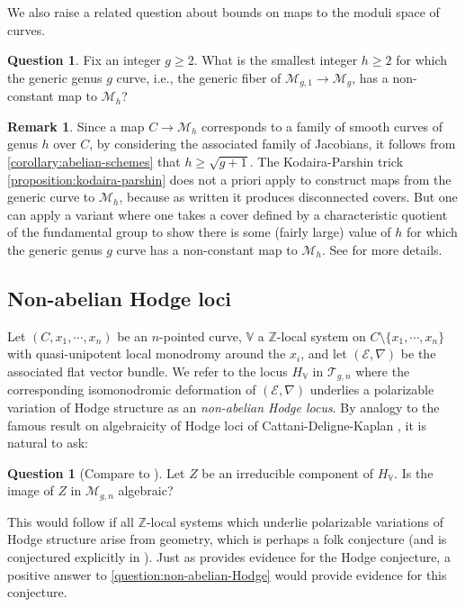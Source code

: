 \documentclass[12 pt]{amsart}
\theoremstyle{plain}
\theoremstyle{definition}
\newtheorem{remark}[subsubsection]{Remark}
\newtheorem{question}[subsubsection]{Question}
\theoremstyle{remark}
\numberwithin{equation}{section}
\begin{document}
We also raise a related question about bounds on maps to the moduli space of
curves.
\begin{question}
	\label{question:}
	Fix an integer $g\geq 2$.
	What is the smallest integer $h \geq 2$ for which the generic genus $g$ curve,
	i.e., the generic fiber of 
	$\mathscr M_{g,1} \to \mathscr M_g$,
	has a
	non-constant map to
	$\mathscr M_h$?
\end{question}
\begin{remark}
	\label{remark:}
	Since a map $C \to \mathscr{M}_h$ corresponds to a family of
smooth curves of genus $h$ over $C$, by considering the associated family of
Jacobians, it follows from \autoref{corollary:abelian-schemes} that $h \geq
\sqrt{g+1}$.
The Kodaira-Parshin trick 
\autoref{proposition:kodaira-parshin} 
does not a priori apply to construct maps from the generic curve to $\mathscr{M}_h$, because as written it produces disconnected covers.
But one can apply a variant where one takes a cover defined by a characteristic quotient of the fundamental group
to show there is some (fairly large) value of $h$ for which the generic genus
$g$ curve has a non-constant map to $\mathscr M_h$.
See \cite[Theorem
1.4]{mcmullen:from-dynamics-on-surfaces-to-rational-points-on-curves} for more
details.
\end{remark}


\subsection{Non-abelian Hodge loci}
Let $(C, x_1, \cdots, x_n)$ be an $n$-pointed curve, $\mathbb{V}$ a
$\mathbb{Z}$-local system on $C\setminus\{x_1, \cdots, x_n\}$ with
quasi-unipotent local monodromy around the $x_i$, and let $(\mathscr{E}, \nabla)$ be the associated flat vector bundle. We refer to the locus $H_{\mathbb{V}}$ in $\mathscr{T}_{g,n}$ where the corresponding isomonodromic deformation of $(\mathscr{E}, \nabla)$ underlies a polarizable variation of Hodge structure as an \emph{non-abelian Hodge locus}. By analogy to the famous result on algebraicity of Hodge loci of Cattani-Deligne-Kaplan \cite{cattani1995locus}, it is natural to ask:
\begin{question}[Compare to {\cite[Conjecture 12.3]{simpson62hodge}}] \label{question:non-abelian-Hodge}
Let $Z$ be an irreducible component of $H_{\mathbb{V}}$. Is the image of $Z$ in $\mathscr{M}_{g,n}$ algebraic? 
\end{question}
This would follow if all $\mathbb{Z}$-local systems which underlie polarizable variations of Hodge structure arise from geometry, which is perhaps a folk conjecture (and is conjectured explicitly in \cite[Conjecture 12.4]{simpson62hodge}). Just as \cite{cattani1995locus} provides evidence for the Hodge conjecture, a positive answer to \autoref{question:non-abelian-Hodge} would provide evidence for this conjecture.
\end{document}
